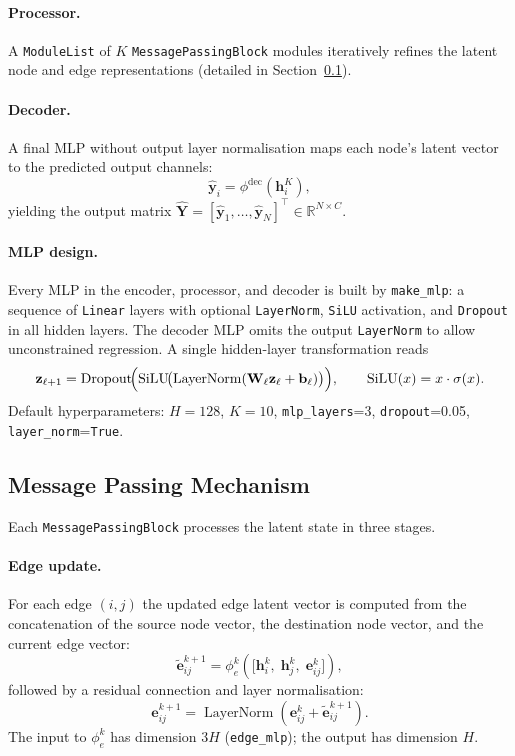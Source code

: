 \paragraph{Processor.}
A \texttt{ModuleList} of \(K\) \texttt{MessagePassingBlock} modules
iteratively refines the latent node and edge representations (detailed in
Section~\ref{sec:message_passing}).

\paragraph{Decoder.}
A final MLP without output layer normalisation maps each node's latent vector
to the predicted output channels:
\[
  \hat{\mathbf{y}}_i = \phi^{\mathrm{dec}}(\mathbf{h}_i^K),
\]
yielding the output matrix
\(\hat{\mathbf{Y}} = [\hat{\mathbf{y}}_1,\dots,\hat{\mathbf{y}}_N]^{\top}
\in\mathbb{R}^{N\times C}\).

\paragraph{MLP design.}
Every MLP in the encoder, processor, and decoder is built by
\texttt{make\_mlp}: a sequence of \texttt{Linear} layers with
optional \texttt{LayerNorm}, \texttt{SiLU} activation, and \texttt{Dropout}
in all hidden layers.
The decoder MLP omits the output \texttt{LayerNorm} to allow unconstrained
regression.
A single hidden-layer transformation reads
\[
  \mathbf{z}_{\ell+1}
  = \operatorname{Dropout}\!\Bigl(
      \operatorname{SiLU}\!\bigl(
        \operatorname{LayerNorm}(\mathbf{W}_\ell\mathbf{z}_\ell + \mathbf{b}_\ell)
      \bigr)
    \Bigr),
  \qquad
  \operatorname{SiLU}(x) = x\cdot\sigma(x).
\]
Default hyperparameters: \(H=128\), \(K=10\), \texttt{mlp\_layers}=3,
\texttt{dropout}=0.05, \texttt{layer\_norm}=\texttt{True}.

\subsection{Message Passing Mechanism}
\label{sec:message_passing}

Each \texttt{MessagePassingBlock} processes the latent state in three stages.

\paragraph{Edge update.}
For each edge \((i,j)\) the updated edge latent vector is computed from the
concatenation of the source node vector, the destination node vector, and the
current edge vector:
\[
  \tilde{\mathbf{e}}_{ij}^{k+1}
  = \phi_e^k\!\left(
      \bigl[\mathbf{h}_i^k,\;\mathbf{h}_j^k,\;\mathbf{e}_{ij}^k\bigr]
    \right),
\]
followed by a residual connection and layer normalisation:
\[
  \mathbf{e}_{ij}^{k+1}
  = \operatorname{LayerNorm}\!\left(
      \mathbf{e}_{ij}^{k} + \tilde{\mathbf{e}}_{ij}^{k+1}
    \right).
\]
The input to \(\phi_e^k\) has dimension \(3H\) (\texttt{edge\_mlp}); the
output has dimension \(H\).

